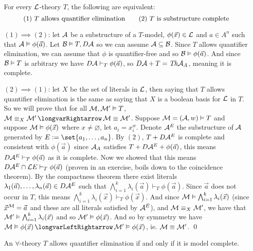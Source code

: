 \edefn

\bthrm

    For every ${\cal L}$-theory $T$, the following are equivalent:
    $$ (1)\ \hbox{$T$ allows quantifier elimination}\qquad (2)\ \hbox{$T$ is substructure complete} $$

\ethrm

$(1)\implies(2)$: let ${\cal A}$ be a substructure of a $T$-model, $\phi(\vec x)\in{\cal L}$ and $a\in A^n$ such that ${\cal A}\vDash\phi(\vec a)$.
Let ${\cal B}\vDash T,D{\cal A}$ so we can assume ${\cal A}\subseteq{\cal B}$.
Since $T$ allows quantifier elimination, we can assume that $\phi$ is quantifier-free and so ${\cal B}\vDash\phi(\vec a)$.
And since ${\cal B}\vDash T$ is arbitrary we have $D{\cal A}\vdash_T\phi(\vec a)$, so $D{\cal A}+T={\it Th}{\cal A}_A$, meaning it is complete.

$(2)\implies(1)$: let $X$ be the set of literals in ${\cal L}$, then saying that $T$ allows quantifier elimination is the same as saying that $X$ is a boolean basis for ${\cal L}$ in $T$.
So we will prove that for all ${\cal M},{\cal M}'\vDash T$, ${\cal M}\equiv_X{\cal M}'\implies{\cal M}\equiv{\cal M}'$.
Suppose ${\cal M}=({\cal A},w)\vDash T$ and suppose ${\cal M}\vDash\phi(\vec x)$ where $x\neq\varnothing$, let $a_i=x_i^w$.
Denote ${\cal A}^E$ the substructure of ${\cal A}$ generated by $E\coloneqq\set{a_1,\dots,a_n}$.
By $(2)$, $T+D{\cal A}^E$ is complete and consistent with $\phi(\vec a)$ since ${\cal A}_A$ satisfies $T+D{\cal A}^E+\phi(\vec a)$, this means $D{\cal A}^E\vdash_T\phi(\vec a)$ as it is complete.
Now we showed that this means $D{\cal A}^E\cap{\cal L}E\vdash_T\phi(\vec a)$ (proven in an exercise, boils down to the coincidence theorem).
By the compactness theorem there exist literals $\lambda_1(\vec a),\dots,\lambda_n(\vec a)\in D{\cal A}^E$ such that $\bigwedge_{i=1}^k\lambda_i(\vec a)\vdash_T\phi(\vec a)$.
Since $\vec a$ does not occur in $T$, this means $\bigwedge_{i=1}^k\lambda_i(\vec x)\vdash_T\phi(\vec x)$.
And since ${\cal M}\vDash\bigwedge_{i=1}^k\lambda_i(\vec x)$ (since $\vec x^{\cal M}=\vec a$ and these are all literals satisfied by ${\cal A}^E$), and ${\cal M}\equiv_X{\cal M}'$, we have that
${\cal M}'\vDash\bigwedge_{i=1}^k\lambda_i(\vec x)$ and so ${\cal M}'\vDash\phi(\vec x)$.
And so by symmetry we have ${\cal M}\vDash\phi(\vec x)\iff{\cal M}'\vDash\phi(\vec x)$, ie. ${\cal M}\equiv{\cal M}'$.
\qed

\bcoro

    An $\forall$-theory $T$ allows quantifier elimination if and only if it is model complete.

